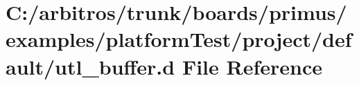 \hypertarget{boards_2primus_2examples_2platform_test_2project_2default_2utl__buffer_8d}{\section{C\-:/arbitros/trunk/boards/primus/examples/platform\-Test/project/default/utl\-\_\-buffer.d File Reference}
\label{boards_2primus_2examples_2platform_test_2project_2default_2utl__buffer_8d}
}
